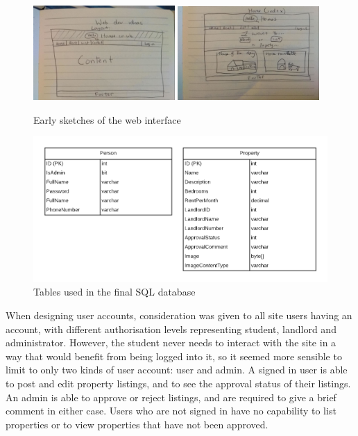\documentclass{article}
\begin{document}
        \begin{figure}[ht]
            \centering
            \includegraphics[width=0.48\textwidth]{figures/layout_sketch1.png}
            \includegraphics[width=0.48\textwidth]{figures/layout_sketch2.png}
            \caption[Early Sketches]{Early sketches of the web interface}
            \label{fig:early_sketches}
        \end{figure}

        \begin{figure}[ht]
            \centering
            \includegraphics[width=\textwidth]{figures/sql_tables.png}
            \caption[SQL Tables]{Tables used in the final SQL database}
            \label{fig:sql_tables}
        \end{figure}

    \par
        When designing user accounts, consideration was given to all site users having an account, with different authorisation levels representing student, landlord and administrator.
        However, the student never needs to interact with the site in a way that would benefit from being logged into it, so it seemed more sensible to limit to only two kinds of user account: user and admin.
        A signed in user is able to post and edit property listings, and to see the approval status of their listings.
        An admin is able to approve or reject listings, and are required to give a brief comment in either case.
        Users who are not signed in have no capability to list properties or to view properties that have not been approved.
\end{document}
